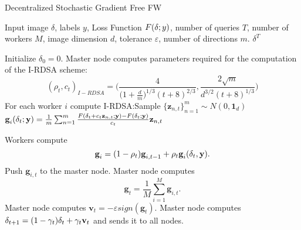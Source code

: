 \begin{algorithm}
	\caption{Decentralized Stochastic Gradient Free FW}\label{decentralized}
	\begin{algorithmic}[1]
		\Require Input image \boldmath$\delta$, labels $y$, Loss Function $F(\text{\boldmath}\delta;y)$, number of queries $T$, number of workers $M$, image dimension $d$, tolerance $\varepsilon$, number of directions $m$.
		\Ensure \boldmath$\delta^T$
		
		\State Initialize \boldmath$\delta_0 = \text{0}$.
		\State Master node computes parameters required for the computation of the I-RDSA scheme: 
		{\scriptsize\[(\rho_t,c_t)_{I-RDSA} =\bigg(\frac{4}{\big(1+\frac{d}{m}\big)^{1/3}(t+8)^{2/3}}, \frac{2\sqrt{m}}{d^{3/2}(t+8)^{1/3}}\bigg)\]}
		\State For each worker $i$ compute I-RDSA:\newline Sample $\{\textbf{z}_{n,t}\}_{n=1}^m \sim N(0, \textbf{1}_d)$ \newline
		 $\textbf{g}_i(\text{\boldmath}\delta_t;\textbf{y}) = \frac{1}{m} \sum_{n=1}^{m} \frac{F(\text{\boldmath}\delta_t + c_t\textbf{z}_{n,t};\textbf{y}) - F(\text{\boldmath}\delta_t;\textbf{y})}{c_t}\textbf{z}_{n,t}$
		
		\State Workers compute \[\textbf{g}_i= (1- \rho_t)\textbf{g}_{i,t-1} + \rho_t\textbf{g}_i(\text{\boldmath}\delta_t,\textbf{y}).\]
		\State Push $\textbf{g}_{i,t}$ to the master node.
		\State Master node computes 
		\[\textbf{g}_t = \frac{1}{M} \sum_{i=1}^{M} \textbf{g}_{i,t}.\]
		\State Master node computes $\textbf{v}_t = - \varepsilon sign(\textbf{g}_t)$.
		\State Master node computes \boldmath$\delta_{t+1} = (1-\gamma_t)\text{\boldmath}\delta_t + \gamma_t\textbf{v}_t$ and sends it to all nodes.
		\EndFor

	\end{algorithmic}
\end{algorithm}
